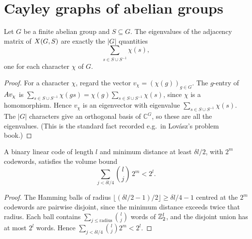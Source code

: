\chapter{Cayley graphs of abelian groups}


\begin{lemma}
  \label{lem:abelian-eigenvalues-characters}
  Let $G$ be a finite abelian group and $S \subseteq G$. The eigenvalues of the
  adjacency matrix of $X(G,S)$ are exactly the $|G|$ quantities
  \[
    \sum_{s \in S \cup S^{-1}} \chi(s),
  \]
  one for each character $\chi$ of $G$.
\end{lemma}
\begin{proof}
  For a character $\chi$, regard the vector $v_\chi = (\chi(g))_{g \in G}$. The
  $g$-entry of $A v_\chi$ is $\sum_{s \in S \cup S^{-1}} \chi(gs) =
  \chi(g)\sum_{s \in S\cup S^{-1}} \chi(s)$, since $\chi$ is a homomorphism.
  Hence $v_\chi$ is an eigenvector with eigenvalue
  $\sum_{s \in S \cup S^{-1}}\chi(s)$. The $|G|$ characters give an orthogonal
  basis of $\mathbb{C}^{G}$, so these are all the eigenvalues. (This is the
  standard fact recorded e.g.\ in Lov\'asz's problem book.)
\end{proof}

\begin{lemma}
  \label{lem:sphere-packing}
  A binary linear code of length $l$ and minimum distance at least $\delta l/2$,
  with $2^{m}$ codewords, satisfies the volume bound
  \[
    \sum_{j < \delta l / 4} \binom{l}{j}\, 2^{m} < 2^{l}.
  \]
\end{lemma}
\begin{proof}
  The Hamming balls of radius $\lfloor (\delta l/2 - 1)/2 \rfloor \ge
  \delta l/4 - 1$ centred at the $2^{m}$ codewords are pairwise disjoint, since
  the minimum distance exceeds twice that radius. Each ball contains
  $\sum_{j \le \text{radius}} \binom{l}{j}$ words of $\mathbb{Z}_2^{l}$, and the disjoint
  union has at most $2^{l}$ words. Hence
  $\sum_{j < \delta l/4}\binom{l}{j}2^{m} < 2^{l}$.
\end{proof}

